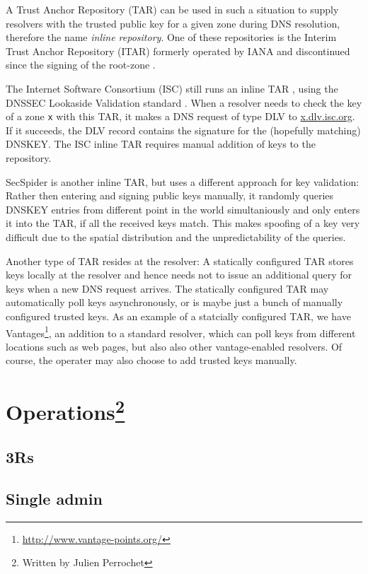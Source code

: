 \documentclass[a4paper,twocolumn]{scrartcl}
\newcommand{\wbjp}{\protect\footnote{Written by Julien Perrochet}}
\begin{document}
A Trust Anchor Repository (TAR) can be used in such a situation to
supply resolvers with the trusted public key for a given zone during
DNS resolution, therefore the name \emph{inline repository}. One of
these repositories is the Interim Trust Anchor Repository (ITAR)
formerly operated by IANA and discontinued since the signing of the
root-zone \cite{itar}.

The Internet Software Consortium (ISC) still runs an inline TAR
\cite{iscDlv}, using the DNSSEC Lookaside Validation standard
\cite{RFC5074}. When a resolver needs to check the key of a zone
\verb|x| with this TAR, it makes a DNS request of type DLV to
\url{x.dlv.isc.org}. If it succeeds, the DLV record contains the
signature for the (hopefully matching) DNSKEY. The ISC inline TAR
requires manual addition of keys to the repository.

SecSpider \cite{secspider, Osterweil09} is another inline TAR, but
uses a different approach for key validation: Rather then entering and
signing public keys manually, it randomly queries DNSKEY entries from
different point in the world simultaniously and only enters it into
the TAR, if all the received keys match. This makes spoofing of a key
very difficult due to the spatial distribution and the
unpredictability of the queries.

Another type of TAR resides at the resolver: A statically configured
TAR stores keys locally at the resolver and hence needs not to issue an
additional query for keys when a new DNS request arrives. The
statically configured TAR may automatically poll keys asynchronously,
or is maybe just a bunch of manually configured trusted keys. As an
example of a statcially configured TAR, we have
Vantages\footnote{\url{http://www.vantage-points.org/}}, an addition
to a standard resolver, \cite{Osterweil09} which can poll keys from
different locations such as web pages, but also also other
vantage-enabled resolvers. Of course, the operater may also choose to
add trusted keys manually.

\section{Operations\wbjp}
\subsection{3Rs}
\subsection{Single admin}
\end{document}
